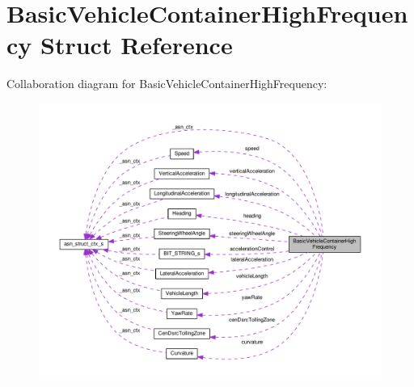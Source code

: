 \hypertarget{structBasicVehicleContainerHighFrequency}{}\section{Basic\+Vehicle\+Container\+High\+Frequency Struct Reference}
\label{structBasicVehicleContainerHighFrequency}


Collaboration diagram for Basic\+Vehicle\+Container\+High\+Frequency\+:\nopagebreak
\begin{figure}[H]
\begin{center}
\leavevmode
\includegraphics[width=350pt]{structBasicVehicleContainerHighFrequency__coll__graph}
\end{center}
\end{figure}
